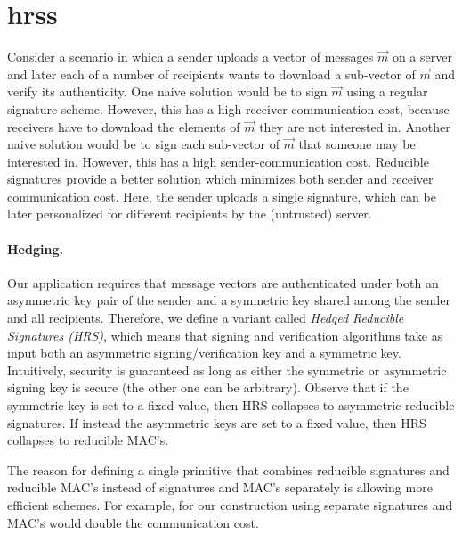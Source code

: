 \section{\aclp{hrs}}\label{sec:sigs}
Consider a scenario in which a sender uploads a vector of messages $\vec m$ on a server and later each of a number of recipients wants to download a sub-vector of $\vec m$ and verify its authenticity. One naive solution would be to sign $\vec m$ using a regular signature scheme. However, this has a high receiver-communication cost, because receivers have to download the elements of $\vec m$ they are not interested in. Another naive solution would be to sign each sub-vector of $\vec m$ that someone may be interested in. However, this has a high sender-communication cost.
Reducible signatures provide a better solution which minimizes both sender and receiver communication cost. Here, the sender uploads a single signature, which can be later personalized for different recipients by the (untrusted) server.


\paragraph{Hedging.}
Our application requires that message vectors are authenticated under both an asymmetric key pair of the sender and a symmetric key shared among the sender and all recipients. Therefore, we define a variant called \emph{Hedged Reducible Signatures (HRS)}, which means that signing and verification algorithms take as input both an asymmetric signing/verification key and a symmetric key. Intuitively, security is guaranteed as long as either the symmetric or asymmetric signing key is secure (the other one can be arbitrary). Observe that if the symmetric key is set to a fixed value, then HRS collapses to asymmetric reducible signatures. If instead the asymmetric keys are set to a fixed value, then HRS collapses to reducible MAC's.

The reason for defining a single primitive that combines reducible signatures and reducible MAC's instead of signatures and MAC's separately is allowing more efficient schemes. For example, for our construction using separate signatures and MAC's would double the communication cost.

